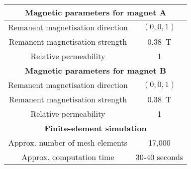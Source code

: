 \begin{table}[h!]
    \centering
    \begin{tabular}{c|c}
        \multicolumn{2}{c}{\textbf{Magnetic parameters for magnet A}} \\ \hline
        Remanent magnetisation direction & \(\left(0,0,1\right)\) \\
        Remanent magnetisation strength & \SI{0.38}{\tesla} \\
        Relative permeability & 1 \\ \hline\hline
        \multicolumn{2}{c}{\textbf{Magnetic parameters for magnet B}} \\ \hline
        Remanent magnetisation direction & \(\left(0,0,1\right)\) \\
        Remanent magnetisation strength & \SI{0.38}{\tesla} \\
        Relative permeability & 1 \\ \hline\hline
        \multicolumn{2}{c}{\textbf{Finite-element simulation}} \\ \hline
        Approx. number of mesh elements & 17,000 \\
        Approx. computation time & 30-40 seconds \\ \hline\hline
    \end{tabular}
\end{table}

\newpage
